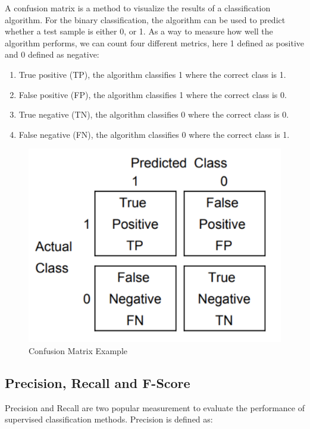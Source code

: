 A confusion matrix is a method to visualize the results of a classification algorithm. For the binary classification, the algorithm can be used to predict whether a test sample is either 0, or 1. As a way to measure how well the algorithm performs, we can count four different metrics, here 1 defined as positive and 0 defined as negative:

\begin{enumerate}

\item True positive (TP), the algorithm classifies 1 where the correct class is 1.
\item False positive (FP), the algorithm classifies 1 where the correct class is 0.
\item True negative (TN), the algorithm classifies 0 where the correct class is 0.
\item False negative (FN), the algorithm classifies 0 where the correct class is 1.

\end{enumerate}

\begin{figure}[hbtp]
\caption{Confusion Matrix Example}
\includegraphics[scale=.5]{../Figures/Confuse_Mat_Example.png}\centering
\end{figure}

\subsection{Precision, Recall and F-Score}

Precision and Recall are two popular measurement to evaluate the performance of supervised classification methods. Precision is defined as:

